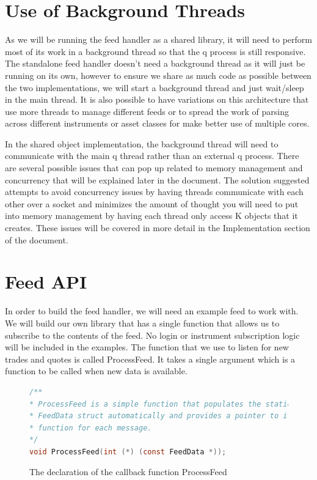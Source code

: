 \section{Use of Background Threads}

As we will be running the feed handler as a shared library, it will need to
perform most of its work in a background thread so that the q process is
still responsive. The standalone feed handler doesn't need a background thread
as it will just be running on its own, however to ensure we share as much code
as possible between the two implementations, we will start a background thread
and just wait/sleep in the main thread. It is also possible to have variations
on this architecture that use more threads to manage different feeds or to spread
the work of parsing across different instruments or asset classes for make better
use of multiple cores.

In the shared object implementation, the background thread will need to communicate
with the main q thread rather than an external q process. There are several possible
issues that can pop up related to memory management and concurrency that will be
explained later in the document. The solution suggested attempts to avoid concurrency
issues by having threads communicate with each other over a socket and minimizes the
amount of thought you will need to put into memory management by having each thread
only access K objects that it creates. These issues will be covered in more detail in
the Implementation section of the document.

\section{Feed API}

In order to build the feed handler, we will need an example feed to work with.
We will build our own library that has a single function that allows us to
subscribe to the contents of the feed. No login or instrument subscription
logic will be included in the examples. The function that we use to listen for
new trades and quotes is called ProcessFeed. It takes a single argument which is
a function to be called when new data is available.

\begin{figure}
\begin{lstlisting}[language=C]
/**
* ProcessFeed is a simple function that populates the statically allocated
* FeedData struct automatically and provides a pointer to it via a callback
* function for each message.
*/
void ProcessFeed(int (*) (const FeedData *));
\end{lstlisting}
\caption{The declaration of the callback function ProcessFeed}
\end{figure}

